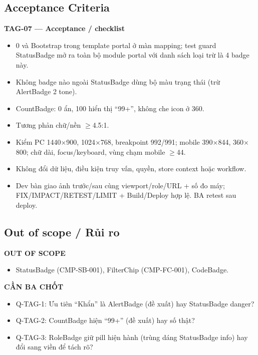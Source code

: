 \documentclass[11pt,a4paper]{report}
\begin{document}
\subsection*{Acceptance Criteria}
\par\smallskip\textbf{TAG-07 — Acceptance / checklist}\par
\begin{itemize}[label=$\square$]
\item 0  và Bootstrap  trong template portal ở màn mapping; test guard StatusBadge mở ra toàn bộ module portal với danh sách loại trừ là 4 badge này.
\item Không badge nào ngoài StatusBadge dùng bộ màu trạng thái (trừ AlertBadge 2 tone).
\item CountBadge: 0 ẩn, 100 hiển thị “99+”, không che icon ở 360.
\item Tương phản chữ/\allowbreak{}nền \(\geq\)4.5:1.
\item Kiểm PC 1440\(\times\)900, 1024\(\times\)768, breakpoint 992/\allowbreak{}991; mobile 390\(\times\)844, 360\(\times\)800; chữ dài, focus/\allowbreak{}keyboard, vùng chạm mobile \(\geq\)44.
\item Không đổi dữ liệu, điều kiện truy vấn, quyền, store context hoặc workflow.
\item Dev bàn giao ảnh trước/\allowbreak{}sau cùng viewport/\allowbreak{}role/\allowbreak{}URL + số đo máy; FIX/\allowbreak{}IMPACT/\allowbreak{}RETEST/\allowbreak{}LIMIT + Build/\allowbreak{}Deploy hợp lệ. BA retest sau deploy.
\end{itemize}
\subsection*{Out of scope / Rủi ro}
\par\smallskip\textbf{OUT OF SCOPE}\par
\begin{itemize}
\item StatusBadge (CMP-SB-001), FilterChip (CMP-FC-001), CodeBadge.
\end{itemize}

\par\smallskip\textbf{CẦN BA CHỐT}\par
\begin{itemize}
\item Q-TAG-1: Ưu tiên “Khẩn” là AlertBadge (đề xuất) hay StatusBadge danger?
\item Q-TAG-2: CountBadge hiện “99+” (đề xuất) hay số thật?
\item Q-TAG-3: RoleBadge giữ pill hiện hành (trùng dáng StatusBadge info) hay đổi sang viền để tách rõ?
\end{itemize}
\end{document}
